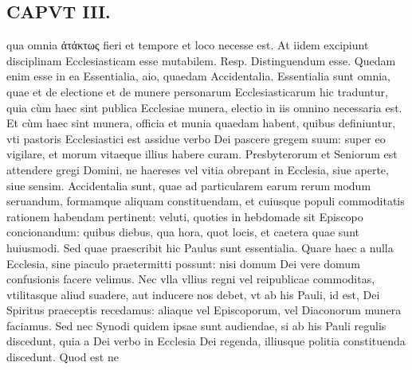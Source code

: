 \documentclass{article}
\begin{document}
\begin{pages}
\section*{CAPVT  III. }
\marginpar{[ p.169 ]}\pstart qua omnia ἀτάκτως fieri et tempore et loco necesse est. At iidem excipiunt disciplinam Ecclesiasticam esse mutabilem. Resp. Distinguendum esse. Quedam enim esse in ea Essentialia, aio, quaedam Accidentalia. Essentialia sunt omnia, quae et de electione et de munere personarum Ecclesiasticarum hic traduntur, quia cùm haec sint publica Ecclesiae munera, electio in iis omnino necessaria est. Et cùm haec sint munera, officia et munia quaedam habent, quibus definiuntur, vti pastoris Ecclesiastici est assidue verbo Dei pascere gregem suum: super eo vigilare, et morum vitaeque illius habere curam. Presbyterorum et Seniorum est attendere gregi Domini, ne haereses vel vitia obrepant in Ecclesia, siue aperte, siue sensim.  \pend\pstart Accidentalia sunt, quae ad particularem earum rerum modum seruandum, formamque aliquam constituendam, et cuiusque populi commoditatis rationem habendam pertinent: veluti, quoties in hebdomade sit Episcopo concionandum: quibus diebus, qua hora, quot locis, et caetera quae sunt huiusmodi. Sed quae praescribit hic Paulus sunt essentialia. Quare haec a nulla Ecclesia, sine piaculo praetermitti possunt: nisi domum Dei vere domum confusionis facere velimus. Nec vlla vllius regni vel reipublicae commoditas, vtilitasque aliud suadere, aut inducere nos debet, vt ab his Pauli, id est, Dei Spiritus praeceptis recedamus: aliaque vel Episcoporum, vel Diaconorum munera faciamus. Sed nec Synodi quidem ipsae sunt audiendae, si ab his Pauli regulis discedunt, quia a Dei verbo in Ecclesia Dei regenda, illiusque politia constituenda discedunt. Quod est ne\pend

\end{pages}
\end{document}
